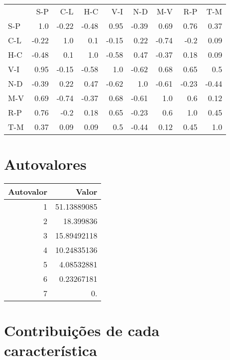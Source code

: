 \documentclass[11pt]{article}
\begin{document}
\begin{center}
\begin{tabular}{lrrrrrrrr}
      &    S-P  &    C-L  &    H-C  &    V-I  &    N-D  &    M-V  &    R-P  &    T-M  \\
 S-P  &    1.0  &  -0.22  &  -0.48  &   0.95  &  -0.39  &   0.69  &   0.76  &   0.37  \\
 C-L  &  -0.22  &    1.0  &    0.1  &  -0.15  &   0.22  &  -0.74  &   -0.2  &   0.09  \\
 H-C  &  -0.48  &    0.1  &    1.0  &  -0.58  &   0.47  &  -0.37  &   0.18  &   0.09  \\
 V-I  &   0.95  &  -0.15  &  -0.58  &    1.0  &  -0.62  &   0.68  &   0.65  &    0.5  \\
 N-D  &  -0.39  &   0.22  &   0.47  &  -0.62  &    1.0  &  -0.61  &  -0.23  &  -0.44  \\
 M-V  &   0.69  &  -0.74  &  -0.37  &   0.68  &  -0.61  &    1.0  &    0.6  &   0.12  \\
 R-P  &   0.76  &   -0.2  &   0.18  &   0.65  &  -0.23  &    0.6  &    1.0  &   0.45  \\
 T-M  &   0.37  &   0.09  &   0.09  &    0.5  &  -0.44  &   0.12  &   0.45  &    1.0  \\
\end{tabular}
\end{center}
\section{Autovalores}
\label{sec-4}



\begin{center}
\begin{tabular}{rr}
 Autovalor  &        Valor  \\
\hline
         1  &  51.13889085  \\
         2  &    18.399836  \\
         3  &  15.89492118  \\
         4  &  10.24835136  \\
         5  &   4.08532881  \\
         6  &   0.23267181  \\
         7  &           0.  \\
\end{tabular}
\end{center}
\section{Contribuições de cada característica}
\label{sec-5}
\end{document}

